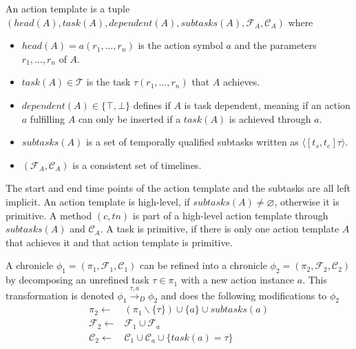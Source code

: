 \begin{definition}
  An action template is a tuple \\ $(head(A), task(A), dependent(A), subtasks(A), \mathcal{F}_A, \mathcal{C}_A)$ where
  \begin{itemize}
    \item $head(A) = a(r_1,\dots,r_n)$ is the action symbol $a$ and the parameters $r_1,\dots,r_n$ of $A$.
    \item $task(A) \in \mathcal{T}$ is the task $\tau(r_1,\dots,r_n)$ that $A$ achieves.
    \item $dependent(A) \in \{\top,\bot\}$ defines if $A$ is task dependent, meaning if an action $a$ fulfilling $A$ can only be inserted if a $task(A)$ is achieved through $a$.
    \item $subtasks(A)$ is a set of temporally qualified subtasks written as $\langle[t_s,t_e] \tau\rangle$.
    \item $(\mathcal{F}_A, \mathcal{C}_A)$ is a consistent set of timelines.
  \end{itemize}
\end{definition}

The start and end time points of the action template and the subtasks are all left implicit.
An action template is high-level, if $subtasks(A) \neq \varnothing$, otherwise it is primitive.
A method $(c,tn)$ is part of a high-level action template through $subtasks(A)$ and $\mathcal{C}_A$.
A task is primitive, if there is only one action template $A$ that achieves it and that action template is primitive.

\begin{definition}
  A chronicle $\phi_1 = (\pi_1,\mathcal{F}_1,\mathcal{C}_1)$ can be refined into a chronicle $\phi_2 = (\pi_2,\mathcal{F}_2,\mathcal{C}_2)$ by decomposing an unrefined task $\tau \in \pi_1$ with a new action instance $a$. This transformation is denoted $\phi_1 \xrightarrow{\tau,a}_D \phi_2$ and does the following modifications to $\phi_2$
  \begin{align*}
    \pi_2 \leftarrow & (\pi_1  \backslash \{\tau\}) \cup \{a\} \cup subtasks(a) \\
    \mathcal{F}_2 \leftarrow & \mathcal{F}_1 \cup \mathcal{F}_a \\
    \mathcal{C}_2 \leftarrow & \mathcal{C}_1 \cup \mathcal{C}_a \cup \{task(a) = \tau\} \\
  \end{align*}
  \label{def:htn-task-dec-fape}
\end{definition}

